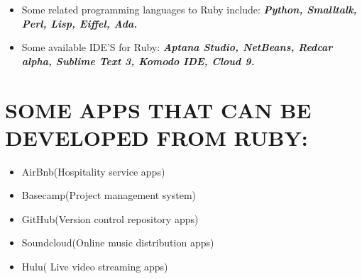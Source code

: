 \documentclass{article}
\begin{document}
	\begin{itemize}
	\item Some related programming languages  to Ruby include: \emph{\textbf{Python, Smalltalk, Perl, Lisp, Eiffel, Ada.}}
	\item Some available IDE’S for Ruby: \emph{\textbf{Aptana Studio, NetBeans, Redcar alpha, Sublime Text 3, Komodo IDE, Cloud 9. }}
    \end{itemize}
	\section{SOME APPS THAT CAN BE DEVELOPED FROM RUBY:}
	 \begin{itemize}
	\item AirBnb(Hospitality service apps)
	\item Basecamp(Project management system)
	\item GitHub(Version control repository apps)
	\item Soundcloud(Online music distribution apps)
	\item Hulu( Live video streaming apps)
     \end{itemize}
\end{document}
